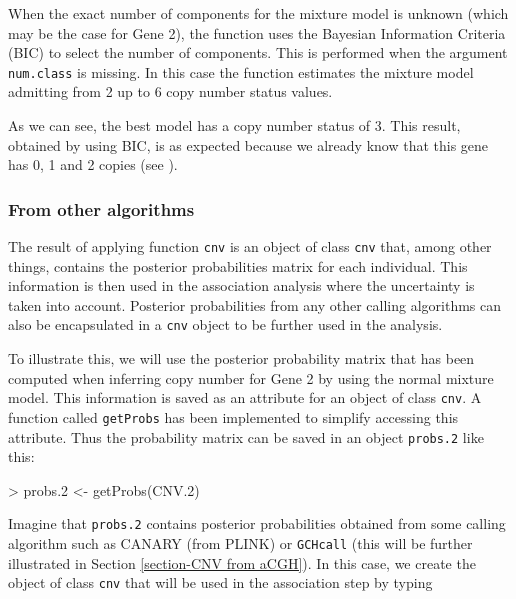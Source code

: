 \documentclass[11pt]{article}
\begin{document}
When the exact number of components for the mixture model is unknown (which may be the case for Gene 2), 
the function uses the Bayesian Information Criteria (BIC) to select the number of components. This is performed when the argument 
{\tt num.class} is missing. In this case the function estimates the mixture model admitting from 2 up to 6 copy number status values.
%

\begin{Schunk}
\end{Schunk}

%
As we can see, the best model has a copy number status of 3. This result, obtained by using BIC, is as expected because we already know 
that this gene has 0, 1 and 2 copies (see \cite{GonSubEsc09}).



\subsubsection{From other algorithms}

The result of applying function \texttt{cnv} is an object of class {\tt cnv} that, among other things, contains the posterior 
probabilities matrix for each individual. This information is then used in the association analysis where the uncertainty is taken 
into account. Posterior probabilities from any other calling algorithms can also be encapsulated in a {\tt cnv} object to be further 
used in the analysis.

To illustrate this, we will use the posterior probability matrix that has been computed when inferring copy number for Gene 2 by 
using the normal mixture model. 
This information is saved as an attribute for an object of class {\tt cnv}. A function called \texttt{getProbs} has been implemented to simplify accessing this attribute.
Thus the probability matrix can be saved in an object \texttt{probs.2} like this:


\begin{Schunk}
\begin{Sinput}
> probs.2 <- getProbs(CNV.2)
\end{Sinput}
\end{Schunk}


Imagine that \texttt{probs.2} contains posterior probabilities obtained from some calling algorithm such as CANARY (from PLINK) or 
{\tt GCHcall} (this will be further illustrated in Section \ref{section-CNV from aCGH}). In this case, we create the object of class 
{\tt cnv} that will be used in the association step by typing
%
\end{document}
